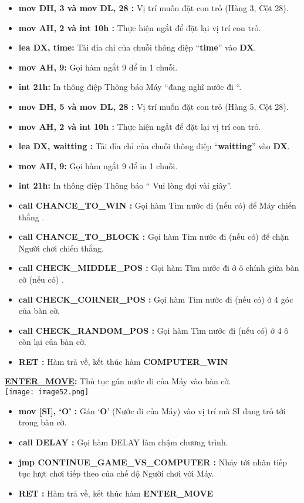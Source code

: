 \begin{itemize}
    \item \textbf{mov DH, 3 và mov DL, 28 :} Vị trí muốn đặt con trỏ (Hàng 3, Cột 28).
    \item \textbf{mov AH, 2 và int 10h : }Thực hiện ngắt để đặt lại vị trí con trỏ.
    \item \textbf{lea DX, time: }Tải đỉa chỉ của chuỗi thông điệp “\textbf{time}” vào \textbf{DX}.
    \item \textbf{mov AH, 9:} Gọi hàm ngắt 9 để in 1 chuỗi.
    \item \textbf{int 21h:} In thông điệp Thông báo Máy “đang nghĩ nước đi “.
    \item \textbf{mov DH, 5 và mov DL, 28 :} Vị trí muốn đặt con trỏ (Hàng 5, Cột 28).
    \item \textbf{mov AH, 2 và int 10h :} Thực hiện ngắt để đặt lại vị trí con trỏ.
    \item \textbf{lea DX, waitting : }Tải đỉa chỉ của chuỗi thông điệp “\textbf{waitting}” vào \textbf{DX}.
    \item \textbf{mov AH, 9:} Gọi hàm ngắt 9 để in 1 chuỗi.
    \item \textbf{int 21h: }In thông điệp Thông báo “ Vui lòng đợi vài giây”.
    \item \textbf{call CHANCE\_TO\_WIN :} Gọi hàm Tìm nước đi (nếu có) để Máy chiến thắng .
    \item \textbf{call CHANCE\_TO\_BLOCK :} Gọi hàm Tìm nước đi (nếu có) để chặn Người chơi chiến thắng.
    \item \textbf{call CHECK\_MIDDLE\_POS : }Gọi hàm Tìm nước đi ở ô chính giữa bàn cờ (nếu có) .
    \item \textbf{call CHECK\_CORNER\_POS : }Gọi hàm Tìm nước đi (nếu có) ở 4 góc của bàn cờ.
    \item \textbf{call CHECK\_RANDOM\_POS : }Gọi hàm Tìm nước đi (nếu có) ở 4 ô còn lại của bàn cờ.
    \item \textbf{RET : }Hàm trả về, kết thúc hàm \textbf{COMPUTER\_WIN}
\end{itemize}
    

\textbf{\underline{ENTER\_MOVE}: }Thủ tục gán nước đi của Máy vào bàn cờ.\\
\texttt{[image: image52.png]}

\begin{itemize}
    \item \textbf{mov [SI], ‘O’ : }Gán ‘\textbf{O}’ (Nước đi của Máy) vào vị trí mà SI đang trỏ tới trong bàn cờ.
    \item \textbf{call DELAY :} Gọi hàm DELAY làm chậm chương trình. 
    \item \textbf{jmp CONTINUE\_GAME\_VS\_COMPUTER :} Nhảy tới nhãn tiếp tục lượt chơi tiếp theo của chế độ Người chơi với Máy.
    \item \textbf{RET :} Hàm trả về, kết thúc hàm \textbf{ENTER\_MOVE}
\end{itemize}

